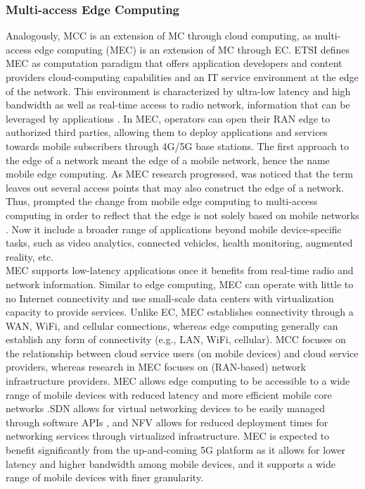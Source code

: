 \subsubsection{Multi-access Edge Computing}
Analogously, MCC is an extension of MC through cloud computing, as multi-access edge computing (MEC) is an extension of MC through EC. ETSI defines MEC as computation paradigm that offers application developers and content providers cloud-computing capabilities and an IT service environment at the edge of the network. This environment is characterized by ultra-low latency and high bandwidth as well as real-time access to radio network, information that can be leveraged by applications \cite{ETSIMult81:online}. In MEC, operators can open their RAN edge to authorized third parties, allowing them to deploy applications and services towards mobile subscribers through 4G/5G base stations. The first approach to the edge of a network meant the edge of a mobile network, hence the name mobile edge computing. As MEC research progressed, was noticed that the term leaves out several access points that may also construct the edge of a network. Thus, prompted the change from mobile edge computing to multi-access computing in order to reflect that the edge is not solely based on mobile networks \cite{MobileEd74:online}. Now it include a broader range of applications beyond mobile device-specific tasks, such as video analytics, connected vehicles, health monitoring, augmented reality, etc.\\
MEC supports low-latency applications once it benefits from real-time radio and network information. Similar to edge computing, MEC can operate with little to no Internet connectivity and use small-scale data centers with virtualization capacity to provide services. Unlike EC, MEC establishes connectivity through a WAN, WiFi, and cellular connections, whereas edge computing generally can establish any form of connectivity (e.g., LAN, WiFi, cellular). MCC focuses on the relationship between cloud service users (on mobile devices) and cloud service providers, whereas research in MEC focuses on (RAN-based) network infrastructure providers. MEC allows edge computing to be accessible to a wide range of mobile devices with reduced latency and more efficient mobile core networks \cite{taleb2017multi}.SDN allows for virtual networking devices to be easily managed through software APIs \cite{kadiyala2017inter}, and NFV allows for reduced deployment times for networking services through virtualized infrastructure. MEC is expected to benefit significantly from the up-and-coming 5G platform as it allows for lower latency and higher bandwidth among mobile devices, and it supports a wide range of mobile devices with finer granularity.

